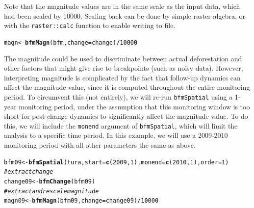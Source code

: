\documentclass{article}\usepackage[]{graphicx}\usepackage[]{color}
\makeatletter
\newcommand{\hlnum}[1]{\textcolor[rgb]{0.686,0.059,0.569}{#1}}%
\newcommand{\hlcom}[1]{\textcolor[rgb]{0.678,0.584,0.686}{\textit{#1}}}%
\newcommand{\hlopt}[1]{\textcolor[rgb]{0,0,0}{#1}}%
\newcommand{\hlstd}[1]{\textcolor[rgb]{0.345,0.345,0.345}{#1}}%
\newcommand{\hlkwb}[1]{\textcolor[rgb]{0.69,0.353,0.396}{#1}}%
\newcommand{\hlkwc}[1]{\textcolor[rgb]{0.333,0.667,0.333}{#1}}%
\newcommand{\hlkwd}[1]{\textcolor[rgb]{0.737,0.353,0.396}{\textbf{#1}}}%
\newenvironment{kframe}{%
 \def\at@end@of@kframe{}%
 \ifinner\ifhmode%
  \def\at@end@of@kframe{\end{minipage}}%
  \begin{minipage}{\columnwidth}%
 \fi\fi%
 \def\FrameCommand##1{\hskip\@totalleftmargin \hskip-\fboxsep
 \colorbox{shadecolor}{##1}\hskip-\fboxsep
     \hskip-\linewidth \hskip-\@totalleftmargin \hskip\columnwidth}%
 \MakeFramed {\advance\hsize-\width
   \@totalleftmargin\z@ \linewidth\hsize
   \@setminipage}}%
 {\par\unskip\endMakeFramed%
 \at@end@of@kframe}
\newenvironment{knitrout}{}{} %
\def\code#1{\texttt{#1}}
\makeatother
\begin{document}
Note that the magnitude values are in the same scale as the input data, which had been scaled by 10000. Scaling back can be done by simple raster algebra, or with the \code{raster::calc} function to enable writing to file.

\begin{knitrout}
\color{fgcolor}\begin{kframe}
\begin{alltt}
\hlstd{magn} \hlkwb{<-} \hlkwd{bfmMagn}\hlstd{(bfm,} \hlkwc{change} \hlstd{= change)}\hlopt{/}\hlnum{10000}
\end{alltt}
\end{kframe}
\end{knitrout}


The magnitude could be used to discriminate between actual deforestation and other factors that might give rise to breakpoints (such as noisy data). However, interpreting magnitude is complicated by the fact that follow-up dynamics can affect the magnitude value, since it is computed throughout the entire monitoring period. To circumvent this (not entirely), we will re-run \code{bfmSpatial} using a 1-year monitoring period, under the assumption that this monitoring window is too short for post-change dynamics to significantly affect the magnitude value. To do this, we will include the \code{monend} argument of \code{bfmSpatial}, which will limit the analysis to a specific time period. In this example, we will use a 2009-2010 monitoring period with all other parameters the same as above.




\begin{knitrout}
\color{fgcolor}\begin{kframe}
\begin{alltt}
\hlstd{bfm09} \hlkwb{<-} \hlkwd{bfmSpatial}\hlstd{(tura,} \hlkwc{start} \hlstd{=} \hlkwd{c}\hlstd{(}\hlnum{2009}\hlstd{,} \hlnum{1}\hlstd{),} \hlkwc{monend} \hlstd{=} \hlkwd{c}\hlstd{(}\hlnum{2010}\hlstd{,} \hlnum{1}\hlstd{),} \hlkwc{order} \hlstd{=} \hlnum{1}\hlstd{)}
\hlcom{# extract change}
\hlstd{change09} \hlkwb{<-} \hlkwd{bfmChange}\hlstd{(bfm09)}
\hlcom{# extract and rescale magnitude}
\hlstd{magn09} \hlkwb{<-} \hlkwd{bfmMagn}\hlstd{(bfm09,} \hlkwc{change} \hlstd{= change09)}\hlopt{/}\hlnum{10000}
\end{alltt}
\end{kframe}
\end{knitrout}
\end{document}
